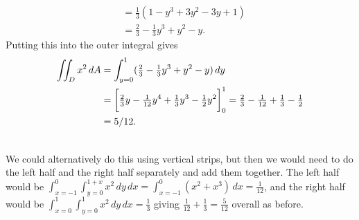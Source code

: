 \documentclass[a4paper]{amsart}
\renewenvironment{solution}{\SolutionInline}{\endSolutionInline}
\begin{document}
\begin{solution}
\begin{itemize}
\begin{minipage}[t]{11cm}
\begin{align*}
       &= \tfrac{1}{3}(1 - y^3 + 3y^2 - 3y + 1) \\
       &= \tfrac{2}{3} - \tfrac{1}{3} y^3 + y^2 - y.  
     \end{align*}
     Putting this into the outer integral gives
     \begin{align*}
      \iint_D x^2\,dA 
      &= \int_{y=0}^1(\tfrac{2}{3} - \tfrac{1}{3} y^3 + y^2 - y)\,dy \\
      &= \CH{\tfrac{2}{3}y - \tfrac{1}{12} y^4 +
             \tfrac{1}{3}y^3 - \tfrac{1}{2}y^2}_0^1 
       = \tfrac{2}{3} - \tfrac{1}{12} + \tfrac{1}{3} - \tfrac{1}{2} \\
      &= 5/12.
     \end{align*}
   \end{minipage} \hfill \parbox[t]{5cm}{
   }\\[2ex]
   We could alternatively do this using vertical strips, but
   then we would need to do the left half and the right half
   separately and add them together.  The left half would be
   $\int_{x=-1}^0\int_{y=0}^{1+x}x^2\,dy\,dx=\int_{x=-1}^0(x^2+x^3)\,dx=\frac{1}{12}$,
   and the right half would be
   $\int_{x=0}^1\int_{y=0}^1x^2\,dy\,dx=\frac{1}{3}$ giving
   $\frac{1}{12}+\frac{1}{3}=\frac{5}{12}$ overall as before.
 \end{itemize}
\end{solution}
\end{document}
